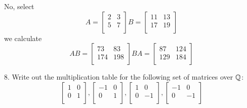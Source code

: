 \begin{mdframed}[style=darkAnswer,frametitle={Joe Starr}]
  No, select $$A=\begin{bmatrix}
      2 & 3 \\
      5 & 7 \\
    \end{bmatrix}
  B=\begin{bmatrix}
      11 & 13 \\
      17 & 19 \\
    \end{bmatrix}$$
    we calculate 
  $$AB=\begin{bmatrix}
      73  & 83  \\
      174 & 198 \\
    \end{bmatrix}
  BA=\begin{bmatrix}
      87  & 124 \\
      129 & 184 \\
    \end{bmatrix}$$
\end{mdframed}
\newpage
\begin{mdframed}[style=darkQuesion]
  8. Write out the multiplication table for the following set of matrices over 
  $\mathbb{Q}$:
  $$\begin{bmatrix}
    1  & 0 \\
    0 & 1 \\
  \end{bmatrix},
  \begin{bmatrix}
    -1  & 0 \\
    0 & 1 \\
  \end{bmatrix},
  \begin{bmatrix}
    1  & 0 \\
    0 & -1 \\
  \end{bmatrix},
  \begin{bmatrix}
    -1  & 0 \\
    0 & -1 \\
  \end{bmatrix}$$

  
\end{mdframed}

